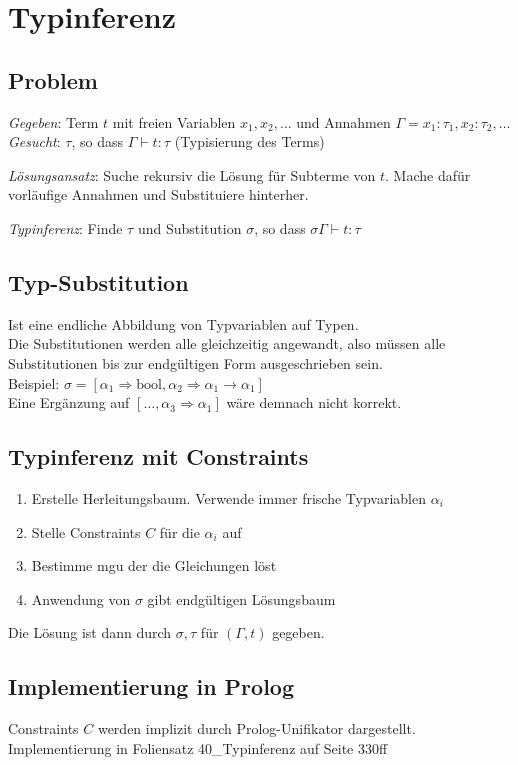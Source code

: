 

\section{Typinferenz}%
\label{inf:sec:typinferenz}

\subsection{Problem}%
\label{inf:sub:problem}
\textit{Gegeben}: Term \(t\) mit freien Variablen \(x_1, x_2, \ldots\) und Annahmen \(\Gamma = x_1 : \tau_1, x_2 : \tau_2, \ldots\)\\
\textit{Gesucht}: \(\tau\), so dass \(\Gamma \vdash t: \tau\) (Typisierung des Terms)

\textit{Lösungsansatz}: Suche rekursiv die Lösung für Subterme von \(t\). Mache dafür vorläufige Annahmen und Substituiere hinterher.

\textit{Typinferenz}: Finde \(\tau\) und Substitution \(\sigma\), so dass \(\sigma \Gamma \vdash t: \tau\)

\subsection{Typ-Substitution}%
\label{inf:sub:substitution}
Ist eine endliche Abbildung von Typvariablen auf Typen.\\
Die Substitutionen werden alle gleichzeitig angewandt, also müssen alle Substitutionen bis zur endgültigen Form
ausgeschrieben sein.\\
Beispiel: \(\sigma = [\alpha_1 \Rightarrow \text{bool}, \alpha_2 \Rightarrow \alpha_1 \rightarrow \alpha_1]\)\\
Eine Ergänzung auf \([\ldots, \alpha_3 \Rightarrow \alpha_1]\) wäre demnach nicht korrekt.

\subsection{Typinferenz mit Constraints}%
\label{inf:sub:constraints}
\begin{enumerate}
  \item Erstelle Herleitungsbaum. Verwende immer frische Typvariablen \(\alpha_i\)
  \item Stelle Constraints \(C\) für die \(\alpha_i\) auf
  \item Bestimme mgu der die Gleichungen löst
  \item Anwendung von \(\sigma\) gibt endgültigen Lösungsbaum
\end{enumerate}
Die Lösung ist dann durch \(\sigma, \tau\) für \((\Gamma, t)\) gegeben.

\subsection{Implementierung in Prolog}%
\label{inf:sub:prolog}
Constraints \(C\) werden implizit durch Prolog-Unifikator dargestellt.
Implementierung in Foliensatz 40\_Typinferenz auf Seite 330ff